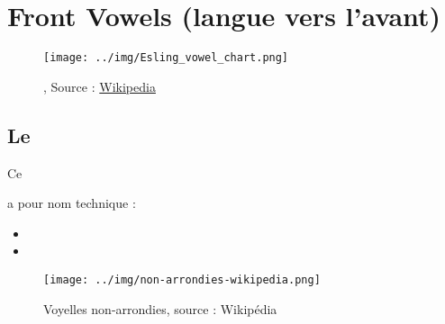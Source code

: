 \chapter{Front Vowels (langue vers l'avant)}\label{chap:frontvow}


\begin{center}
  \begin{figure}[h]
    \centering
    \texttt{[image: ../img/Esling\_vowel\_chart.png]}
    \caption[]{, Source : \href{https://en.wikipedia.org/w/index.php?curid=46937434}{Wikipedia}}
    \label{fig:front-vowels}
  \end{figure}
\end{center}

\newpage
\minitoc
\newpage

\section{Le \son {}}\label{sec:ilong}

\hypertarget{ilong}{Ce \son} a pour nom technique :

\begin{itemize}
\item {}
\item {}
\end{itemize}

\begin{center}
  \begin{figure}[h]
    \centering
    \texttt{[image: ../img/non-arrondies-wikipedia.png]}
    \caption{Voyelles non-arrondies, source : Wikipédia}
    \label{fig:voy-ferm}
  \end{figure}
\end{center}

\indicsound


